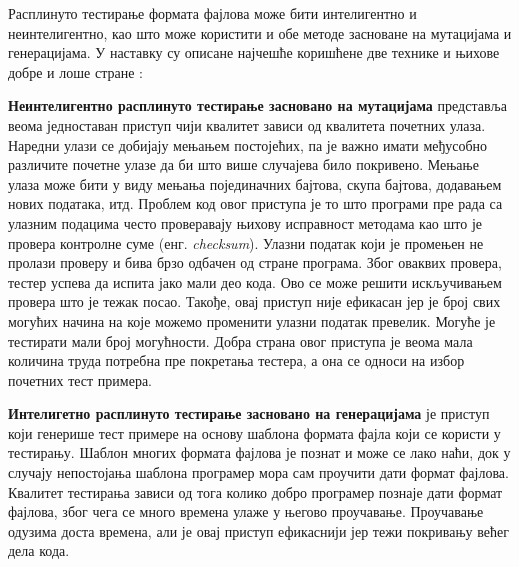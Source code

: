 \documentclass[12pt,oneside]{memoir}
\begin{document}
Расплинуто тестирање формата фајлова може бити интелигентно и неинтелигентно, као што може користити и обе методе засноване на мутацијама и генерацијама. У наставку су описане најчешће коришћене две технике и њихове добре и лоше стране \cite{fuzzingBrute}: 
\begin{description}
\item \textbf{Неинтелигентно расплинуто тестирање засновано на мутацијама} представља веома једноставан приступ чији квалитет зависи од квалитета почетних улаза. Наредни улази се добијају мењањем постојећих, па је важно имати међусобно различите почетне улазе да би што више случајева било покривено. Мењање улаза може бити у виду мењања појединачних бајтова, скупа бајтова, додавањем нових података, итд. Проблем код овог приступа је то што програми пре рада са улазним подацима често проверавају њихову исправност методама као што је провера контролне суме (енг. \textit{checksum}). Улазни податак који је промењен не пролази проверу и бива брзо одбачен од стране програма. Због оваквих провера, тестер успева да испита јако мали део кода. Ово се може решити искључивањем провера што је тежак посао. Такође, овај приступ није ефикасан јер је број свих могућих начина на које можемо променити улазни податак превелик. Могуће је тестирати мали број могућности. Добра страна овог приступа је веома мала количина труда потребна пре покретања тестера, а она се односи на избор почетних тест примера. 
\item \textbf{Интелигетно расплинуто тестирање засновано на генерацијама} је приступ који генерише тест примере на основу шаблона формата фајла који се користи у тестирању. Шаблон многих формата фајлова је познат и може се лако наћи, док у случају непостојања шаблона програмер мора сам проучити дати формат фајлова. Квалитет тестирања зависи од тога колико добро програмер познаје дати формат фајлова, због чега се много времена улаже у његово проучавање. Проучавање одузима доста времена, али је овај приступ ефикаснији јер тежи покривању већег дела кода.
\end{description}
\end{document}
